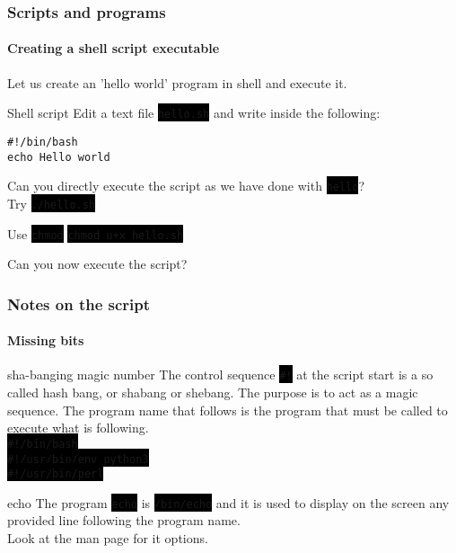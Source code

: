 \documentclass[unknownkeysallowed, 10pt, a4 paper, handout]{beamer}
\newcommand{\code}[1]{\colorbox{black}{\color{green}\texttt{#1}}}
\begin{document}
\begin{frame}[label=exercise3, fragile=singleslide]
  \frametitle{Scripts and programs}
  \framesubtitle{Creating a shell script executable}

  Let us create an 'hello world' program in shell and execute it.
  \begin{exampleblock}{Shell script}
      Edit a text file \code{hello.sh} and write inside the following:
\begin{verbatim}
#!/bin/bash
echo Hello world
\end{verbatim}
  \end{exampleblock}

  \begin{alertblock}{}
    Can you directly execute the script as we have done with \code{hello}? \\
    Try \code{./hello.sh}
  \end{alertblock}

  \begin{exampleblock}{Use \code{chmod}}
      \code{chmod u+x hello.sh}
  \end{exampleblock}

  \begin{alertblock}{}
    Can you now execute the script?
  \end{alertblock}
\end{frame}


\begin{frame}[label=scriptnotes]
  \frametitle{Notes on the script}
  \framesubtitle{Missing bits}
  \begin{block}{sha-banging magic number}
    The control sequence \code{\#!} at the script start is a so called
      hash bang, or shabang or shebang. The purpose is to act as a magic
      sequence. The program name that follows is the program that must
      be called to execute what is following. \\
      \code{\#!/bin/bash} \\
      \code{\#!/usr/bin/env python3} \\
      \code{\#!/usr/bin/perl}
  \end{block}
  \begin{block}{echo}
    The program \code{echo} is \code{/bin/echo} and it is used to display
      on the screen any provided line following the program name. \\
    Look at the man page for it options.
  \end{block}
\end{frame}
\end{document}
